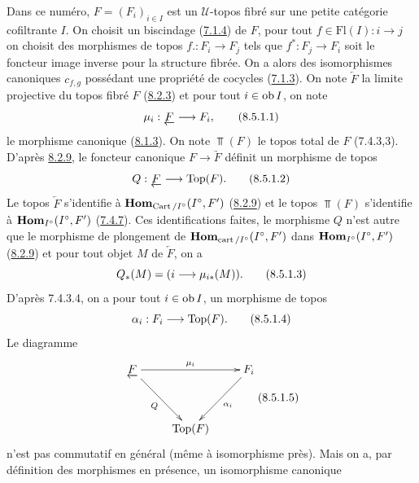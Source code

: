 \documentclass[10pt]{../fichiers-configuration-latex/smfart}
\begin{document}
Dans ce numéro, $F = (F_i)_{i \in I}$ est un $𝒰$-topos fibré sur une
petite catégorie cofiltrante $I$. On choisit un biscindage (\hyperref[VI.subsubsec7.1.4]{7.1.4}) de
$F$, \ie pour tout $f \in \text{Fl}(I) : i \to j$ on choisit des morphismes
de topos $f. : F_i \to F_j$ tels que $f^{\ast} : F_j \to F_i$ soit le
foncteur image inverse pour la structure fibrée. On a alors des
isomorphismes canoniques $c_{f, g}$ possédant une propriété de
cocycles (\hyperref[VI.subsubsec7.1.3]{7.1.3}). On note $\underleftarrow{F}$ la limite projective du
topos fibré $F$ (\hyperref[VI.thm8.2.3]{8.2.3}) et pour tout $i \in \operatorname{ob} I$, on note
\begin{equation*}
\mu_i : \underleftarrow{F} \to F_i{\quoi},\tag{8.5.1.1}
\end{equation*}
le morphisme canonique (\hyperref[VI.subsubsec8.1.3]{8.1.3}). On note $\Top(F)$ le topos total de
$F$ (7.4.3,3). D'après \hyperref[VI.thm8.2.9]{8.2.9}, le foncteur canonique $F \to
\underrightarrow{F}$ définit un morphisme de topos
\begin{equation*}
Q : \underleftarrow{F} \to \Top(F){\quoi}.\tag{8.5.1.2}
\end{equation*}
Le topos $\underleftarrow{F}$ s'identifie à $\operatorname{\mathbf{Hom}}_{\operatorname{Cart} /I^{\circ}} (I^{\circ}, F')$
(\hyperref[VI.thm8.2.9]{8.2.9}) et le
topos $\Top(F)$ s'identifie à $\operatorname{\mathbf{Hom}}_{I^{\circ}}(I^{\circ}, F')$ (\hyperref[VI.prop7.4.7]{7.4.7}). Ces
identifications faites, le morphisme $Q$ n'est autre que le morphisme
de plongement de $\operatorname{\mathbf{Hom}}_{\operatorname{cart}/I^{\circ}}(I^{\circ}, F')$ dans
$\operatorname{\mathbf{Hom}}_{I^{\circ}}(I^{\circ}, F')$
(\hyperref[VI.thm8.2.9]{8.2.9}) et pour tout objet $M$ de $\underleftarrow{F}$, on a
\begin{equation*}
Q_{\ast} (M) = (i \to \mu_{i\ast}(M)){\quoi}.\tag{8.5.1.3}
\end{equation*}
D'après 7.4.3.4, on a pour tout $i \in \operatorname{ob} I$, un morphisme de topos
\begin{equation*}
\alpha_i : F_i \to \Top(F){\quoi}.\tag{8.5.1.4}
\end{equation*}
Le diagramme\pageoriginale
\[\vcenter{
\xymatrix@R=1.25cm{
{\underleftarrow{F}}  \ar[rr]^{\mu_i}\ar[rd]_{Q}&                 &F_i\ar[ld]^{\alpha_i}\\
                                   &  \Top(F)      &
}}\leqno{(8.5.1.5)}
\]
n'est pas commutatif en général (même à isomorphisme près). Mais on a,
par définition des morphismes en présence, un isomorphisme canonique
\end{document}
